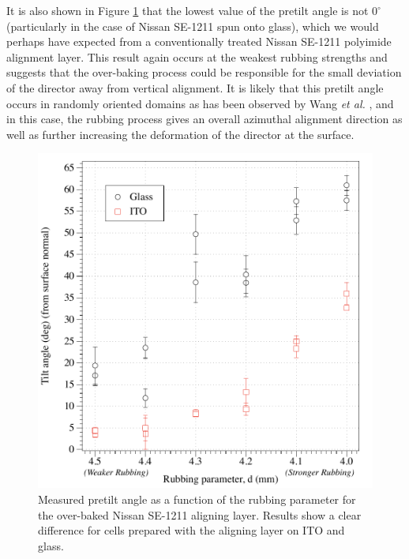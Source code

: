It is also shown in Figure \ref{fig:ito_glass} that the lowest value of the pretilt angle is not $0^{\circ}$ (particularly in the case of Nissan SE-1211 spun onto glass), which we would perhaps have expected from a conventionally treated Nissan SE-1211 polyimide alignment layer. This result again occurs at the weakest rubbing strengths and suggests that the over-baking process could be responsible for the small deviation of the director away from vertical alignment. It is likely that this pretilt angle occurs in randomly oriented domains as has been observed by Wang \textsl{et al.} \cite{Wang2007}, and in this case, the rubbing process gives an overall azimuthal alignment direction as well as further increasing the deformation of the director at the surface.

\begin{figure}
\begin{center}
\includegraphics{Figures/Pretilt/ito_glass}
\end{center}
\caption[Pretilt angle as a function of rubbing parameter for glass and ITO surfaces]{\label{fig:ito_glass}{Measured pretilt angle as a function of the rubbing parameter for the over-baked Nissan SE-1211 aligning layer. Results show a clear difference for cells prepared with the aligning layer on ITO and glass.}}
\end{figure}

